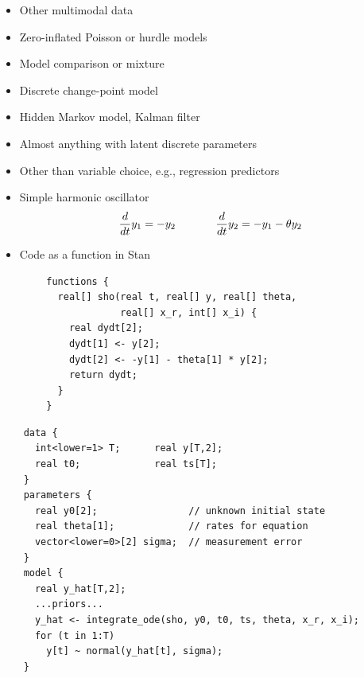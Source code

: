 \documentclass[10pt]{report}
\begin{document}
%
\begin{itemize}
\item Other multimodal data
\item Zero-inflated Poisson or hurdle models
\item Model comparison or mixture
\item Discrete change-point model
\item Hidden Markov model, Kalman filter
\item Almost anything with latent discrete parameters
\hfill
\item Other than variable choice, e.g., regression predictors
\end{itemize}


%
\begin{itemize}
\item Simple harmonic oscillator
{\small
\begin{equation*}
\frac{d}{dt} y_1 = -y_2 
\hspace*{0.5in}
\frac{d}{dt} y_2 = -y_1 - \theta y_2
\end{equation*}
}
\item Code as a function in Stan
\end{itemize}
{\footnotesize
\begin{Verbatim}
        functions {
          real[] sho(real t, real[] y, real[] theta,
                     real[] x_r, int[] x_i) {
            real dydt[2];
            dydt[1] <- y[2];
            dydt[2] <- -y[1] - theta[1] * y[2];
            return dydt;
          }
        }
\end{Verbatim}
}


%
{\footnotesize
\begin{Verbatim}
    data {
      int<lower=1> T;      real y[T,2];
      real t0;             real ts[T];
    }
    parameters {
      real y0[2];                // unknown initial state
      real theta[1];             // rates for equation
      vector<lower=0>[2] sigma;  // measurement error
    }
    model {
      real y_hat[T,2];
      ...priors...
      y_hat <- integrate_ode(sho, y0, t0, ts, theta, x_r, x_i);
      for (t in 1:T)
        y[t] ~ normal(y_hat[t], sigma);
    }
\end{Verbatim}
}
\end{document}
